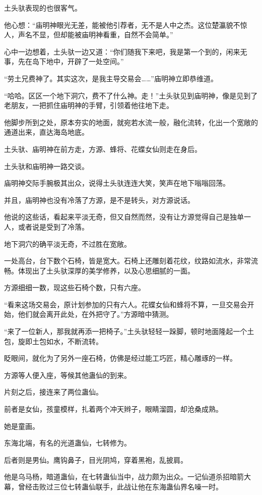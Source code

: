 \begin{this_body}
土头驮表现的也很客气。

他心想：“庙明神眼光无差，能被他引荐者，无不是人中之杰。这位楚瀛貌不惊人，声名不显，但却能被庙明神看重，自然不会简单。”

心中一边想着，土头驮一边又道：“你们随我下来吧，我是第一个到的，闲来无事，先在岛下地中，开辟了一处空间。”

“劳土兄费神了。其实这次，是我主导交易会……”庙明神立即恭维道。

“哈哈。区区一个地下洞穴，费不了什么神。走！”土头驮见到庙明神，像是见到了老朋友，一把抓住庙明神的手臂，引领着他往地下走。

他脚步所到之处，原本夯实的地面，就宛若水流一般，融化流转，化出一个宽敞的通道出来，直达海岛地底。

土头驮、庙明神在前方走，方源、蜂将、花蝶女仙则走在身后。

土头驮和庙明神一路交谈。

庙明神交际手腕极其出众，说得土头驮连连大笑，笑声在地下嗡嗡回荡。

并且，庙明神也没有冷落了方源，是不是转头，对方源说话。

他说的这些话，看起来平淡无奇，但又自然而然，没有让方源觉得自己是独单一人，或者说是受到了冷落。

地下洞穴的确平淡无奇，不过胜在宽敞。

一处高台，台下数个石椅，皆是宽大。石椅上还雕刻着花纹，纹路如流水，非常流畅。体现出了土头驮深厚的美学修养，以及心思细腻的一面。

方源细细一数，现这些石椅个数，只有六座。

“看来这场交易会，原计划参加的只有六人。花蝶女仙和蜂将不算，一旦交易会开始，他们就会离开此处，在外把守了。”方源暗中猜测。

“来了一位新人，那我就再添一把椅子。”土头驮轻轻一跺脚，顿时地面隆起一个土包，旋即土包如水，不断流转。

眨眼间，就化为了另外一座石椅，仿佛是经过能工巧匠，精心雕琢的一样。

方源等人便入座，等候其他蛊仙的到来。

片刻之后，接连来了两位蛊仙。

前者是女仙，孩童模样，扎着两个冲天辫子，眼睛溜圆，却沧桑成熟。

她是童画。

东海北端，有名的光道蛊仙，七转修为。

后者则是男仙。鹰钩鼻子，目光阴鸠，穿着黑袍，乱披肩。

他是乌马杨，暗道蛊仙，在七转蛊仙当中，战力颇为出众。一记仙道杀招暗箭大幕，曾经击败过三位七转蛊仙联手，此战让他在东海蛊仙界名噪一时。


\end{this_body}
